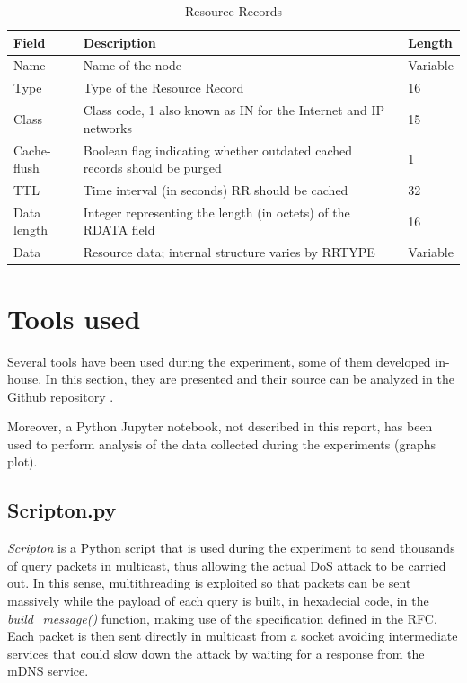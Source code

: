 \documentclass[fleqn, 11pt]{SelfArx} %
\begin{document}
\begin{table}[hbt]
	\centering
	\begin{tabular}{|C{2.0cm}|C{4.2cm}|C{1.25cm}|}
		\hline
		\textbf{Field} & \textbf{Description} & \textbf{Length} \\
		\hline
		\hline
		Name & Name of the node & Variable\\
		\hline
		Type & Type of the Resource Record & 16\\
		\hline
		Class & Class code, 1 also known as IN for the Internet and IP networks & 15\\
		\hline
		Cache-flush & Boolean flag indicating whether outdated cached records should be purged & 1\\
		\hline
		TTL & Time interval (in seconds) RR should be cached & 32\\
		\hline
		Data length & Integer representing the length (in octets) of the RDATA field & 16\\
		\hline
		Data & Resource data; internal structure varies by RRTYPE & Variable\\
		\hline
	\end{tabular}
	\caption{Resource Records}
	\label{table}
\end{table}


\section{Tools used}
Several tools have been used during the experiment, some of them developed in-house. In this section, they are presented and their source can be analyzed in the Github repository \cite{repo}. \newline

Moreover, a Python Jupyter notebook, not described in this report, has been used to perform analysis of the data collected during the experiments (graphs plot).

\subsection{Scripton.py}
\textit{Scripton} is a Python script that is used during the experiment to send thousands of query packets in multicast, thus allowing the actual DoS attack to be carried out.
In this sense, multithreading is exploited so that packets can be sent massively while the payload of each query is built, in hexadecial code, in the \textit{build\_message()} function, making use of the specification defined in the RFC\cite{rfc6762}. Each packet is then sent directly in multicast from a socket avoiding intermediate services that could slow down the attack by waiting for a response from the mDNS service. \newline
\end{document}

